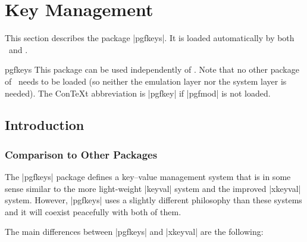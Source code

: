 %
%
%


\section{Key Management}
\label{section-keys}

This section describes the package |pgfkeys|. It is loaded
automatically by both \pgfname\ and \tikzname.

\begin{package}{pgfkeys}
  This package can be used independently of \pgfname. Note that no
  other package of \pgfname\ needs to be loaded (so neither the
  emulation layer nor the system layer is needed). The Con\TeX t
  abbreviation is |pgfkey| if |pgfmod| is not loaded.
\end{package}



\subsection{Introduction}

\subsubsection{Comparison to Other Packages}

The |pgfkeys| package defines a key--value management system that is in
some sense similar to the more light-weight |keyval| system and the
improved |xkeyval| system. However, |pgfkeys| uses a slightly
different philosophy than these systems and it will coexist peacefully
with both of them.

The main differences between |pgfkeys| and |xkeyval| are the
following:

